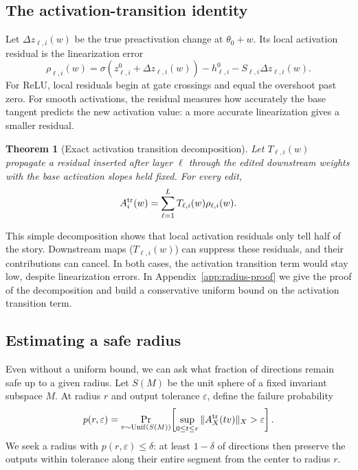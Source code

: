 \documentclass[twoside]{article}
\newtheorem{theorem}{Theorem}
\theoremstyle{remark}
\theoremstyle{highlightdefinition}
\theoremstyle{remark}
\begin{document}
\subsection{The activation-transition identity}
\label{sec:radius-bounds}
Let $\Delta z_{\ell,i}(w)$ be the true preactivation change at $\theta_0+w$. Its local activation residual is the linearization error
\[
 \rho_{\ell,i}(w)=\sigma(z_{\ell,i}^0+\Delta z_{\ell,i}(w))
                  -h_{\ell,i}^0-S_{\ell,i}\Delta z_{\ell,i}(w).
\]
For ReLU, local residuals begin at gate crossings and equal the overshoot past zero. For smooth activations, the residual measures how accurately the base tangent predicts the new activation value: a more accurate linearization gives a smaller residual. 
\begin{theorem}[Exact activation transition decomposition]
\label{thm:transition}
Let $T_{\ell,i}(w)$ propagate a residual inserted after layer $\ell$ through the edited downstream weights with the base activation slopes held fixed. For every edit,
\begin{equation}
 A_i^{\rm tr}(w)=\sum_{\ell=1}^L T_{\ell,i}(w)\rho_{\ell,i}(w).
 \label{eq:transition}
\end{equation}
\end{theorem}
This simple decomposition shows that local activation residuals only tell half of the story. Downstream maps ($T_{\ell,i}(w)$) can suppress these residuals, and their contributions can cancel. In both cases, the activation transition term would stay low, despite linearization errors. In Appendix~\ref{app:radius-proof} we give the proof of the decomposition and build a conservative uniform bound on the activation transition term. 

\subsection{Estimating a safe radius}
\label{sec:radius-measured}
Even without a uniform bound, we can ask what fraction of directions remain safe up to a given radius. Let $S(M)$ be the unit sphere of a fixed invariant subspace $M$. At radius $r$ and output tolerance $\varepsilon$, define the failure probability
\[
 p(r,\varepsilon)=\Pr_{v\sim\operatorname{Unif}(S(M))}\!\left[
 \sup_{0\le t\le r}\|A_X^{\rm tr}(tv)\|_X>\varepsilon\right].
\]
We seek a radius with $p(r,\varepsilon)\le\delta$: at least $1-\delta$ of directions then preserve the outputs within tolerance along their entire segment from the center to radius $r$.
\end{document}
